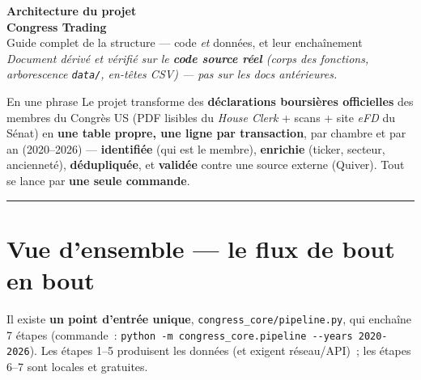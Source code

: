 \documentclass[11pt,a4paper]{article}
\newcommand{\co}[1]{\texttt{\small #1}}
\begin{document}
\begin{center}
{\Huge\bfseries\color{coreC} Architecture du projet}\\[2pt]
{\Huge\bfseries\color{coreC} Congress Trading}\\[10pt]
{\large Guide complet de la structure — code \emph{et} données, et leur enchaînement}\\[6pt]
{\small\itshape Document dérivé et vérifié sur le \textbf{code source réel} (corps des fonctions,
arborescence \co{data/}, en-têtes CSV) — \emph{pas} sur les docs antérieures.}
\end{center}

\begin{keybox}{En une phrase}
Le projet transforme des \textbf{déclarations boursières officielles} des membres du Congrès US
(PDF lisibles du \emph{House Clerk} + scans + site \emph{eFD} du Sénat) en \textbf{une table propre, une
ligne par transaction}, par chambre et par an (2020–2026) — \textbf{identifiée} (qui est le membre),
\textbf{enrichie} (ticker, secteur, ancienneté), \textbf{dédupliquée}, et \textbf{validée} contre une
source externe (Quiver). Tout se lance par \textbf{une seule commande}.
\end{keybox}

\vspace{2pt}
\hrule
\vspace{4pt}
{\small\tableofcontents}
\newpage

\section{Vue d'ensemble — le flux de bout en bout}

Il existe \textbf{un point d'entrée unique}, \co{congress_core/pipeline.py}, qui enchaîne 7 étapes
(commande~: \co{python -m congress_core.pipeline -{}-years 2020-2026}). Les étapes 1–5 produisent les
données (et exigent réseau/API)~; les étapes 6–7 sont locales et gratuites.
\end{document}
